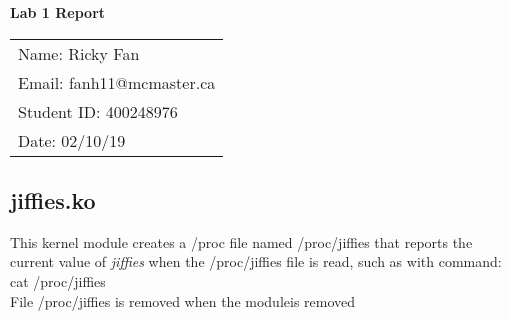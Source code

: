 \documentclass[11pt,fleqn]{article}
\begin{document}
\begin{center}
	{\Large \textbf{Lab 1 Report}}\\[6mm]
	\begin{tabular}{l}
        {\large Name: Ricky Fan}       \\
		{\large Email: fanh11@mcmaster.ca} \\
		{\large Student ID: 400248976}    \\
		{\large Date: 02/10/19}
	\end{tabular}

\end{center}

\medskip

\subsection*{jiffies.ko}
This kernel module creates a /proc file named /proc/jiffies 
that reports the current value of \emph{jiffies} when the /proc/jiffies 
file is read, such as with command: \\

cat /proc/jiffies \\

\noindent 
File /proc/jiffies is removed when the moduleis removed


\end{document}
